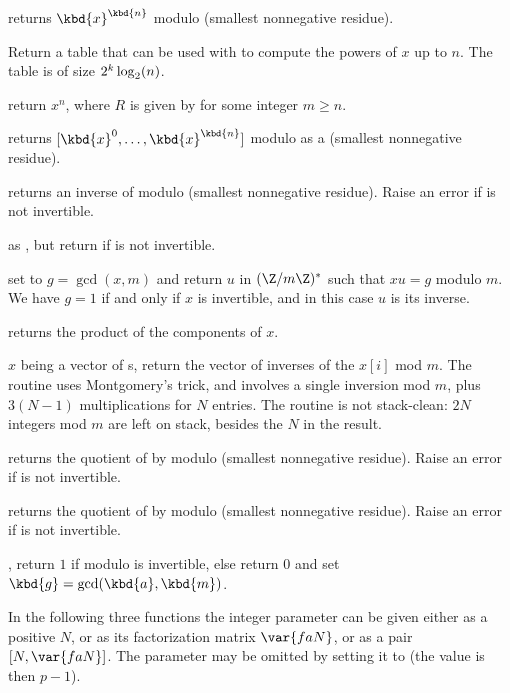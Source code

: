  returns $\kbd{x}^\kbd{n}$
modulo  (smallest nonnegative residue).

Return a table  that can be used with
 to compute the powers of $x$ up to $n$.
The table is of size $2^k\*\log_2(n)$.

return $x^n$, where $R$ is given by 
for some integer $m\geq n$.

 returns
$[\kbd{x}^0, \dots, \kbd{x}^\kbd{n}]$ modulo  as a 
 (smallest nonnegative residue).

 returns an inverse of  modulo 
(smallest nonnegative residue). Raise an error if  is not invertible.

 as , but return
 if  is not invertible.

 set  to
$g = \gcd(x,m)$ and return $u$ in $(\Z/m\Z)^*$ such that $x u = g$ modulo $m$.
We have $g = 1$ if and only if $x$ is invertible, and in this case $u$
is its inverse.

 returns the product of the components of
$x$.

 $x$ being a vector of s, return
the vector of inverses of the $x[i]$ mod $m$. The routine uses Montgomery's
trick, and involves a single inversion mod $m$, plus $3(N-1)$ multiplications
for $N$ entries. The routine is not stack-clean: $2N$ integers mod $m$
are left on stack, besides the $N$ in the result.

 returns the quotient of  by
 modulo  (smallest nonnegative residue). Raise an error if
 is not invertible.

 returns the quotient of  by
 modulo  (smallest nonnegative residue). Raise an error if
 is not invertible.

,  return $1$ if 
modulo  is invertible, else return $0$ and set
$\kbd{g} = \gcd(\kbd{a},\kbd{m})$.

In the following three functions the integer parameter  can be given
either as a positive  $N$, or as its factorization matrix $\var{faN}$,
 or as a pair $[N,\var{faN}]$. The parameter may be omitted by setting it to
 (the value is then $p-1$).

